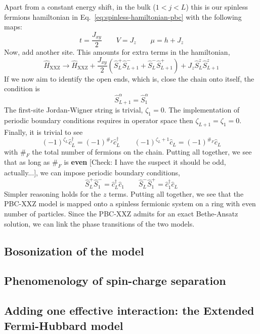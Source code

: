 Apart from a constant energy shift, in the bulk ($1<j<L$) this is our spinless fermions hamiltonian in Eq.~\eqref{eq:spinless-hamiltonian-pbc} with the following maps:
\[
	t = \frac{J_{xy}}{2}
	\qquad
	V = J_z
	\qquad
	\mu = h + J_z
\]
Now, add another site. This amounts for extra terms in the hamiltonian,
\[
	\hat H_\mathrm{XXZ} \to \hat H_\mathrm{XXZ} + \frac{J_{xy}}{2} \left( 
		\hat S_L^+ \hat S_{L+1}^- + \hat S_L^- \hat S_{L+1}^+
	\right) + J_z \hat S_L^z \hat S_{L+1}^z
\]
If we now aim to identify the open ends, which is, close the chain onto itself, the condition is
\[
	\hat S_{L+1}^\alpha = \hat S_1^\alpha
\]
The first-site Jordan-Wigner string is trivial, $\zeta_1 = 0$. The implementation of periodic boundary conditions requires in operator space then $\zeta_{L+1} = \zeta_1 = 0$. Finally, it is trivial to see
\[
	(-1)^{\zeta_L} \hat c_L^\dagger = (-1)^{\#_F} \hat c_L^\dagger
	\qquad
	(-1)^{\zeta_L+1} \hat c_L = (-1)^{\#_F} \hat c_L
\]
with $\#_F$ the total number of fermions on the chain. Putting all together, we see that as long as $\#_F$ is \textbf{even} {\color{tabred}[Check: I have the suspect it should be odd, actually...]}, we can impose periodic boundary conditions,
\[
	\hat S_L^+ \hat S_1^- = \hat c_L^\dagger \hat c_1
	\qquad
	\hat S_L^- \hat S_1^+ = \hat c_1^\dagger \hat c_L
\]
Simpler reasoning holds for the $z$ terms. Putting all together, we see that the PBC-$\mathrm{XXZ}$ model is mapped onto a spinless fermionic system on a ring with even number of particles. Since the PBC-$\mathrm{XXZ}$ admits for an exact Bethe-Ansatz solution, we can link the phase transitions of the two models.

\subsection{Bosonization of the model}

\todo

\subsection{Phenomenology of spin-charge separation}

\todo

\subsection{Adding one effective interaction: the Extended Fermi-Hubbard model}

\todo
